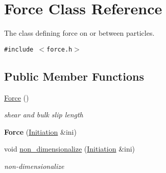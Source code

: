 \hypertarget{classForce}{
\section{Force Class Reference}
\label{classForce}
}
The class defining force on or between particles.  


{\tt \#include $<$force.h$>$}

\subsection*{Public Member Functions}
\begin{CompactItemize}
\item 
\hyperlink{classForce_00983e3bbc206a00bb9253deafc4e424}{Force} ()
\begin{CompactList}\small\item\em shear and bulk slip length \item\end{CompactList}\item 
\hypertarget{classForce_6ce6bddb4bbe52af88b12827324a818d}{
\textbf{Force} (\hyperlink{classInitiation}{Initiation} \&ini)}
\label{classForce_6ce6bddb4bbe52af88b12827324a818d}

\item 
\hypertarget{classForce_75f2e675a6d57e08127d47b6bc31d3d9}{
void \hyperlink{classForce_75f2e675a6d57e08127d47b6bc31d3d9}{non\_\-dimensionalize} (\hyperlink{classInitiation}{Initiation} \&ini)}
\label{classForce_75f2e675a6d57e08127d47b6bc31d3d9}

\begin{CompactList}\small\item\em non-dimensionalize \item\end{CompactList}\end{CompactItemize}
